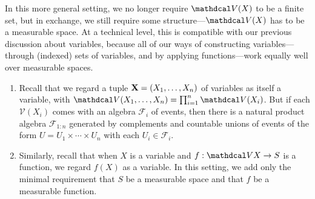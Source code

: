 In this more general setting, we no longer require $\V(X)$ to be a finite set, but in exchange, we still require some structure---$\V(X)$ has to be a measurable space. At a technical level, this is compatible with our previous discussion about variables, because all of our ways of constructing variables---through (indexed) sets of variables, and by applying functions---work equally well over measurable spaces. 
\begin{enumerate}
    \item Recall that we regard a tuple $\mathbf X = (X_1, \ldots, X_n)$ of variables as itself a variable, with $\V(X_1, \ldots, X_n) = \prod_{i=1}^n \V(X_i)$.
        But if each $\mathcal V(X_i)$ comes with an algebra $\mathcal F_i$ of events, then there is a natural product algebra $\mathcal F_{1:n}$ generated by complements and countable unions of events of the form $U = U_1 \times \cdots \times U_n$ with each $U_i \in \mathcal F_i$. 

    \item Similarly, recall that when $X$ is a variable and $f : \V X \to S$ is a function, we regard $f(X)$ as a variable. In this setting, we add only the minimal requirement that $S$ be a measurable space and that $f$ be a measurable function.  
\end{enumerate}
% 


